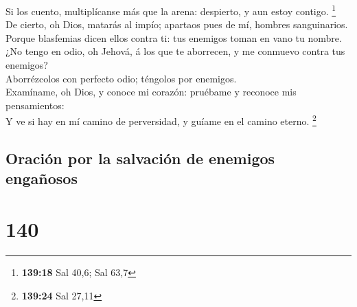  Si los cuento, multiplícanse más que la arena: despierto,
y aun estoy contigo. \footnote{\textbf{139:18} Sal 40,6; Sal 63,7}\\
 De cierto, oh Dios, matarás al impío; apartaos pues de mí,
hombres sanguinarios.\\
 Porque blasfemias dicen ellos contra ti: tus enemigos
toman en vano tu nombre.\\
 ¿No tengo en odio, oh Jehová, á los que te aborrecen, y me
conmuevo contra tus enemigos?\\
 Aborrézcolos con perfecto odio; téngolos por enemigos.\\
 Examíname, oh Dios, y conoce mi corazón: pruébame y
reconoce mis pensamientos:\\
 Y ve si hay en mí camino de perversidad, y guíame en el
camino eterno. \footnote{\textbf{139:24} Sal 27,11}

\hypertarget{oraciuxf3n-por-la-salvaciuxf3n-de-enemigos-engauxf1osos}{%
\subsection{Oración por la salvación de enemigos
engañosos}\label{oraciuxf3n-por-la-salvaciuxf3n-de-enemigos-engauxf1osos}}

\hypertarget{section-139}{%
\section{140}\label{section-139}}

